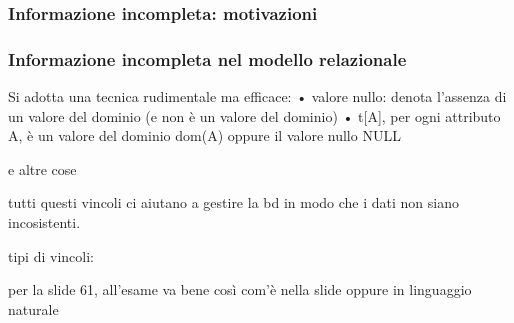 \subsubsection{Informazione incompleta: motivazioni}

\subsubsection{Informazione incompleta nel modello relazionale}
Si adotta una tecnica rudimentale ma efficace:
• valore nullo: denota l'assenza di un valore del dominio
(e non è un valore del dominio)
• t[A], per ogni attributo A, è un valore del dominio dom(A)
oppure il valore nullo NULL

e altre cose

tutti questi vincoli ci aiutano a gestire la bd in modo che i dati non siano incosistenti.

tipi di vincoli:

per la slide 61, all'esame va bene così com'è nella slide oppure in linguaggio naturale
